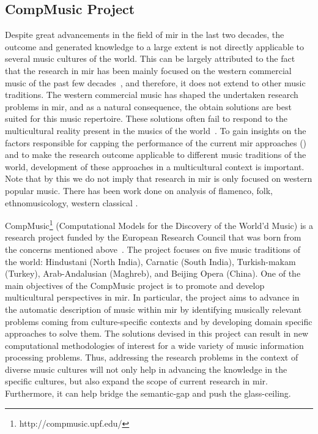 \subsection{CompMusic Project}
\label{sec:intro_motivation_compmusic}

Despite great advancements in the field of \gls{mir} in the last two decades, the outcome and generated knowledge to a large extent is not directly applicable to several music cultures of the world. This can be largely attributed to the fact that the research in \gls{mir} has been mainly focused on the western commercial music of the past few decades~\citep{XavierSerra2011}, and therefore, it does not extend to other music traditions. The western commercial music has shaped the undertaken research problems in \gls{mir}, and as a natural consequence, the obtain solutions are best suited for this music repertoire. These solutions often fail to respond to the multicultural reality present in the musics of the world~\citep{XavierSerra2011}. To gain insights on the factors responsible for capping the performance of the current \gls{mir} approaches () and to make the research outcome applicable to different music traditions of the world, development of these approaches in a multicultural context is important. Note that by this we do not imply that research  in \gls{mir} is only focused on western popular music. There has been work done on analysis of flamenco, folk, ethnomusicology, western classical .

CompMusic\footnote{http://compmusic.upf.edu/} (Computational Models for the Discovery of the World'd Music) is a research project funded by the European Research Council that was born from the concerns mentioned above~\citep{XavierSerra2011}. The project focuses on five music traditions of the world: Hindustani (North India), Carnatic (South India), Turkish-makam (Turkey), Arab-Andalusian (Maghreb), and Beijing Opera (China). One of the main objectives of the CompMusic project is to promote and develop multicultural perspectives in \gls{mir}. In particular, the project aims to advance in the automatic description of music within \gls{mir} by identifying musically relevant problems coming from culture-specific contexts and by developing domain specific approaches to solve them. The solutions devised in this project can result in new computational methodologies of interest for a wide variety of music information processing problems. Thus, addressing the research problems in the context of diverse music cultures will not only help in advancing the knowledge in the specific cultures, but also expand the scope of current research in \gls{mir}. Furthermore, it can help bridge the semantic-gap and push the glass-ceiling. 

